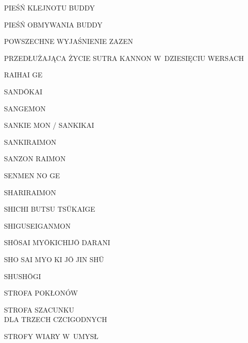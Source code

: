 \par\noindent PIEŚŃ KLEJNOTU BUDDY \dotfill \makebox[1.0cm][r]{\pageref{piesn_klejnotu_buddy}}
\par\noindent PIEŚŃ OBMYWANIA BUDDY \dotfill \makebox[1.0cm][r]{\pageref{piesn_obmywania_buddy}}
\par\noindent POWSZECHNE WYJAŚNIENIE ZAZEN \dotfill \makebox[1.0cm][r]{\pageref{ogolne_zalecenia}}
\par\noindent PRZEDŁUŻAJĄCA ŻYCIE SUTRA KANNON W~DZIESIĘCIU WERSACH \dotfill \makebox[1.0cm][r]{\pageref{sutra_kannon}}
\par\noindent RAIHAI GE \dotfill \makebox[1.0cm][r]{\pageref{raihaige}}
\par\noindent SAND\=OKAI \dotfill \makebox[1.0cm][r]{\pageref{sandokai}}
\par\noindent SANGEMON \dotfill \makebox[1.0cm][r]{\pageref{sangemon}}
\par\noindent SANKIE MON / SANKIKAI \dotfill \makebox[1.0cm][r]{\pageref{sankiemon}}
\par\noindent SANKIRAIMON \dotfill \makebox[1.0cm][r]{\pageref{sankiraimon}}
\par\noindent SANZON RAIMON \dotfill \makebox[1.0cm][r]{\pageref{sanzonraimon}}
\par\noindent SENMEN NO GE \dotfill \makebox[1.0cm][r]{\pageref{senmen_no_ge}}
\par\noindent SHARIRAIMON \dotfill \makebox[1.0cm][r]{\pageref{shariraimon}}
\par\noindent SHICHI BUTSU TS\=UKAIGE \dotfill \makebox[1.0cm][r]{\pageref{shichi_butsu_tsukaige}}
\par\noindent SHIGUSEIGANMON \dotfill \makebox[1.0cm][r]{\pageref{shiguseiganmon}}
\par\noindent SH\=OSAI MY\=OKICHIJ\=O DARANI \dotfill \makebox[1.0cm][r]{\pageref{sio_saj_mio}}
\par\noindent SHO SAI MYO KI J\=O JIN SH\=U \dotfill \makebox[1.0cm][r]{\pageref{sho_sai_myo_ki_jo}}
\par\noindent SHUSH\=OGI \dotfill \makebox[1.0cm][r]{\pageref{shushogi}}
\par\noindent STROFA POKŁONÓW \dotfill \makebox[1.0cm][r]{\pageref{strofa_poklonow}}
\par\noindent STROFA SZACUNKU\\ DLA TRZECH CZCIGODNYCH \dotfill \makebox[1.0cm][r]{\pageref{strofa_szacunku}}
\par\noindent STROFY WIARY W~UMYSŁ \dotfill \makebox[1.0cm][r]{\pageref{strofy_wiary_w_umysl}}
